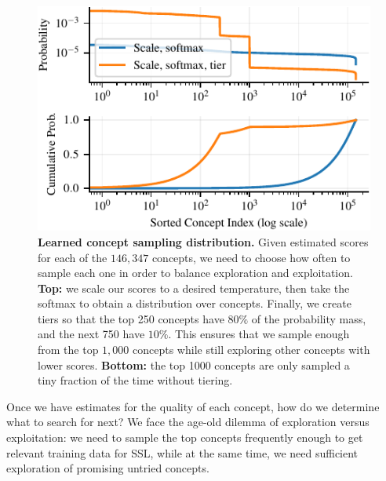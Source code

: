 \begin{figure}[t]
    \centering
    \includegraphics[width=0.7\linewidth]{figures/sampling_dist_shorter.pdf}
    \caption{\textbf{Learned concept sampling distribution.} Given estimated scores for each of the $146{,}347$ concepts, we need to choose how often to sample each one in order to balance exploration and exploitation.
    \textbf{Top:} we scale our scores to a desired temperature, then take the softmax to obtain a distribution over concepts. Finally, we create tiers so that the top 250 concepts have $80\%$ of the probability mass, and the next 750 have $10\%$. This ensures that we sample enough from the top $1{,}000$ concepts while still exploring other concepts with lower scores.
    \textbf{Bottom:} the top 1000 concepts are only sampled a tiny fraction of the time without tiering.}
    \label{fig:sampling_dist}
    \vspace{-0.12in}
\end{figure}

Once we have estimates for the quality of each concept, how do we determine what to search for next?
We face the age-old dilemma of exploration versus exploitation:
we need to sample the top concepts frequently enough to get relevant training data for SSL, while at the same time, we need sufficient exploration of promising untried concepts.

